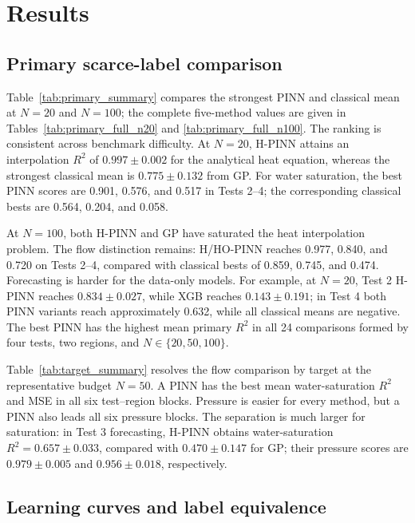 \section{Results}
\label{sec:results}

\subsection{Primary scarce-label comparison}



Table~\ref{tab:primary_summary} compares the strongest PINN and classical mean at \(N=20\) and \(N=100\); the complete five-method values are given in Tables~\ref{tab:primary_full_n20} and \ref{tab:primary_full_n100}. The ranking is consistent across benchmark difficulty. At \(N=20\), H-PINN attains an interpolation \(R^2\) of \(0.997\pm0.002\) for the analytical heat equation, whereas the strongest classical mean is \(0.775\pm0.132\) from GP. For water saturation, the best PINN scores are 0.901, 0.576, and 0.517 in Tests 2--4; the corresponding classical bests are 0.564, 0.204, and 0.058.

At \(N=100\), both H-PINN and GP have saturated the heat interpolation problem. The flow distinction remains: H/HO-PINN reaches 0.977, 0.840, and 0.720 on Tests 2--4, compared with classical bests of 0.859, 0.745, and 0.474. Forecasting is harder for the data-only models. For example, at \(N=20\), Test 2 H-PINN reaches \(0.834\pm0.027\), while XGB reaches \(0.143\pm0.191\); in Test 4 both PINN variants reach approximately 0.632, while all classical means are negative. The best PINN has the highest mean primary \(R^2\) in all 24 comparisons formed by four tests, two regions, and \(N\in\{20,50,100\}\).



Table~\ref{tab:target_summary} resolves the flow comparison by target at the representative budget \(N=50\). A PINN has the best mean water-saturation \(R^2\) and MSE in all six test--region blocks. Pressure is easier for every method, but a PINN also leads all six pressure blocks. The separation is much larger for saturation: in Test 3 forecasting, H-PINN obtains water-saturation \(R^2=0.657\pm0.033\), compared with \(0.470\pm0.147\) for GP; their pressure scores are \(0.979\pm0.005\) and \(0.956\pm0.018\), respectively.

\subsection{Learning curves and label equivalence}

